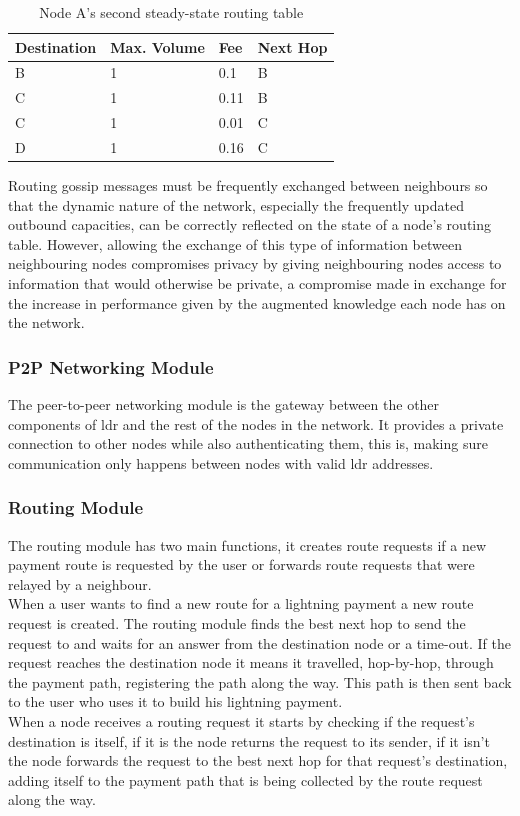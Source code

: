 \begin{table}[H]
\centering
\begin{tabular}{|l|l|l|l|}
\hline
\rowcolor[HTML]{C0C0C0} 
Destination & Max. Volume   & Fee   & Next Hop \\ \hline
B           & 1             & 0.1   & B       \\ \hline
C           & 1             & 0.11  & B       \\ \hline
C           & 1             & 0.01  & C       \\ \hline
D           & 1             & 0.16  & C       \\ \hline
\end{tabular}
\caption{Node A's second steady-state routing table}
\label{table:routing_table_steady_a_2}
\end{table}

Routing gossip messages must be frequently exchanged between neighbours so that the dynamic nature of the network, especially the frequently updated outbound capacities, can be correctly reflected on the state of a node's routing table. However, allowing the exchange of this type of information between neighbouring nodes compromises privacy by giving neighbouring nodes access to information that would otherwise be private, a compromise made in exchange for the increase in performance given by the augmented knowledge each node has on the network.

\subsubsection{P2P Networking Module}

The peer-to-peer networking module is the gateway between the other components of \acrshort{ldr} and the rest of the nodes in the network. It provides a private connection to other nodes while also authenticating them, this is, making sure communication only happens between nodes with valid \acrshort{ldr} addresses.

\subsubsection{Routing Module}

The routing module has two main functions, it creates route requests if a new payment route is requested by the user or forwards route requests that were relayed by a neighbour. \\
When a user wants to find a new route for a lightning payment a new route request is created. The routing module finds the best next hop to send the request to and waits for an answer from the destination node or a time-out. If the request reaches the destination node it means it travelled, hop-by-hop, through the payment path, registering the path along the way. This path is then sent back to the user who uses it to build his lightning payment. \\
When a node receives a routing request it starts by checking if the request's destination is itself, if it is the node returns the request to its sender, if it isn't the node forwards the request to the best next hop for that request's destination, adding itself to the payment path that is being collected by the route request along the way.
